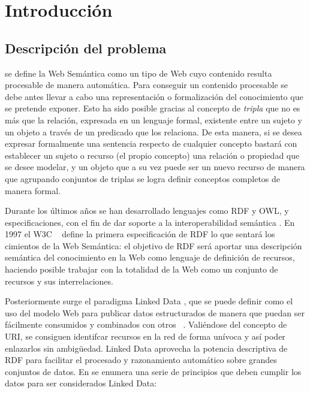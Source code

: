 \chapter{Introducción}
\label{chap:Introduccion}

\section{Descripción del problema}


 \cite{bernerslee2001semantic} se define la Web Semántica como
un tipo de Web cuyo contenido resulta procesable de manera automática. Para
conseguir un contenido procesable se debe antes llevar a cabo una
representación o formalización del conocimiento que se pretende exponer. Esto ha
sido posible gracias al concepto de \textit{tripla}
que no es más que la relación, expresada en un lenguaje formal, existente entre un sujeto y un objeto a través de
un predicado que los relaciona. De esta manera, si se desea expresar formalmente una sentencia
respecto de cualquier concepto bastará con establecer un sujeto o recurso (el
propio concepto) una relación o propiedad que se desee modelar, y un objeto que
a su vez puede ser un nuevo recurso de manera que agrupando conjuntos de triplas
se logra definir conceptos completos de manera formal. 


Durante los últimos años se han desarrollado lenguajes como \acs{RDF} y
\acs{OWL}, y
especificaciones, con el fin de dar soporte a 
la interoperabilidad semántica \cite{Shadbolt:2006:SWR:1155313.1155373}. En
1997 el \acf{W3C} ~\cite{W3CSW} define la primera especificación de \acs{RDF} lo que sentará los cimientos de la Web Semántica: el
objetivo de \acs{RDF} será aportar una descripción semántica del conocimiento en la
Web \cite{Shadbolt:2006:SWR:1155313.1155373} como lenguaje de definición de
recursos, haciendo posible trabajar con la totalidad de la Web
como un conjunto de recursos y sus interrelaciones. 

Posteriormente surge el paradigma Linked Data \cite{bernerslee:2009}, que se puede definir
como el uso del modelo Web para publicar datos estructurados de manera que
puedan ser fácilmente consumidos y combinados con otros ~\cite{bizer_linked_2009}. Valiéndose del concepto
de \acf{URI}, se consiguen identifcar recursos en la red de forma unívoca y así
poder enlazarlos sin ambigüedad. Linked Data
aprovecha la potencia descriptiva de \acs{RDF} para facilitar el procesado
y razonamiento automático sobre grandes conjuntos de datos. En
\cite{bernerslee:2009} se enumera una serie de principios que deben cumplir los
datos para ser considerados Linked Data: 


